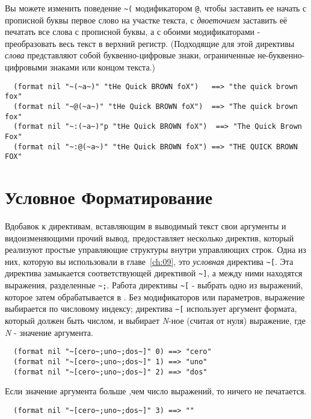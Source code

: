 {Вы можете изменить поведение \lstinline!~(! модификатором \lstinline!@!, чтобы заставить
ее начать с прописной буквы первое слово на участке текста, с \textit{двоеточием}
заставить её печатать все слова с прописной буквы, а с обоими модификаторами -
преобразовать весь текст в верхний регистр. (Подходящие для этой директивы \textit{слова}
представляют собой буквенно-цифровые знаки, ограниченные не-буквенно-цифровыми знаками или
концом текста.)

\begin{verbatim}
  (format nil "~(~a~)" "tHe Quick BROWN foX")   ==> "the quick brown fox"
  (format nil "~@(~a~)" "tHe Quick BROWN foX")  ==> "The quick brown fox"
  (format nil "~:(~a~)"p "tHe Quick BROWN foX")  ==> "The Quick Brown Fox"
  (format nil "~:@(~a~)" "tHe Quick BROWN foX") ==> "THE QUICK BROWN FOX"
\end{verbatim}

\section{Условное Форматирование}

Вдобавок к директивам, вставляющим в выводимый текст свои аргументы и видоизменяющими
прочий вывод,  предоставляет несколько директив, который реализуют простые
управляющие структуры внутри управляющих строк. Одна из них, которую вы использовали в
главе~\ref{ch:09}, это \textit{условная} директива \lstinline!~[!. Эта директива
замыкается соответствующей директивой \lstinline!~]!, а между ними находятся выражения,
разделенные \lstinline!~;!. Работа директивы \lstinline!~[!  - выбрать одно из выражений,
которое затем обрабатывается в . Без модификаторов или параметров, выражение
выбирается по числовому индексу; директива \lstinline!~[! использует аргумент формата,
который должен быть числом, и выбирает \textit{N}-ное (считая от нуля) выражение, где
\textit{N} - значение аргумента.

\begin{verbatim}
  (format nil "~[cero~;uno~;dos~]" 0) ==> "cero"
  (format nil "~[cero~;uno~;dos~]" 1) ==> "uno"
  (format nil "~[cero~;uno~;dos~]" 2) ==> "dos"
\end{verbatim}

Если значение аргумента больше ,чем число выражений, то ничего не печатается.

\begin{verbatim}
  (format nil "~[cero~;uno~;dos~]" 3) ==> ""
\end{verbatim}

}
